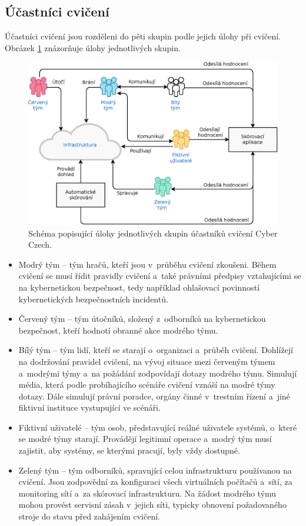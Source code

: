 \documentclass[
  digital,
  twoside,
  table, 
  nolof, 
  nolot
]{fithesis3}
\begin{document}
\subsection{Účastníci cvičení}
Účastníci cvičení jsou rozděleni do pěti skupin podle jejich úlohy při cvičení. Obrázek \ref{fig:ucastnici} znázorňuje úlohy jednotlivých skupin.

\begin{figure}[ht!]
    \centering
    \includegraphics[width=14cm]{images/ucastnici-2.eps}
    \caption{Schéma popisující úlohy jednotlivých skupin účastníků cvičení Cyber Czech.}
    \label{fig:ucastnici}
\end{figure}

\begin{itemize}
\item Modrý tým -- tým hračů, kteří jsou v~průběhu cvičení zkoušeni. Během cvičení se musí řídit pravidly cvičení a~také právními předpisy vztahujícími se na kybernetickou bezpečnost, tedy například ohlašovací povinností kybernetických bezpečnostních incidentů.
\item Červený tým -- tým útočníků, složený z~odborníků na kybernetickou bezpečnost, kteří hodnotí obranné akce modrého týmu. 
\item Bílý tým -- tým lidí, kteří se starají o~organizaci a~průběh cvičení. Dohlížejí na dodržování pravidel cvičení, na vývoj situace mezi červeným týmem a~modrými týmy a~na požádání zodpovídají dotazy modrého týmu. Simulují média, která podle probíhajícího scénáře cvičení vznáší na modré týmy dotazy. Dále simulují právní poradce, orgány činné v~trestním řízení a~jiné fiktivní instituce vystupující ve scénáři.
\item Fiktivní uživatelé -- tým osob, představující reálné uživatele systémů, o~které se modré týmy starají. Provádějí legitimní operace a~modrý tým musí zajistit, aby systémy, se kterými pracují, byly vždy dostupné.
\item Zelený tým -- tým odborníků, spravující celou infrastrukturu používanou na cvičení. Jsou zodpovědní za konfiguraci všech virtuálních počítačů a~sítí, za monitoring sítí a~za skórovací infrastrukturu. Na žádost modrého týmu mohou provést servisní zásah v~jejich síti, typicky obnovení požadovaného stroje do stavu před zahájením cvičení.
\end{itemize}
\end{document}
